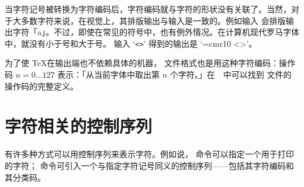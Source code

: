 \documentclass{book}
\begin{document}
当字符记号被转换为字符编码后，字符编码就与字符的形状没有关联了。当然，对于大多数字符来说，在视觉上，其排版输出与输入是一致的。例如输入  会排版输出字符「a」。不过，即使在常见的符号中，也有例外情况。在计算机现代罗马字体中，就没有小于号和大于号。
%
输入 `\verb.<>.' 得到的输出是 `{\font\cmr=cmr10 \cmr<>}'。

为了使 \TeX 在输出端也不依赖具体的机器， 文件格式也是用这种字符编码：操作码 $n=0\ldots127$ 表示：「从当前字体中取出第 $n$ 个字符。」在~\cite{Knuth:TeXprogram}~中可以找到  文件的操作码的完整定义。

\section{字符相关的控制序列}

有许多种方式可以用控制序列来表示字符。例如说， 命令可以指定一个用于打印的字符； 命令可引入一个与指定字符记号同义的控制序列——包括其字符编码和其分类码。

\end{document}
